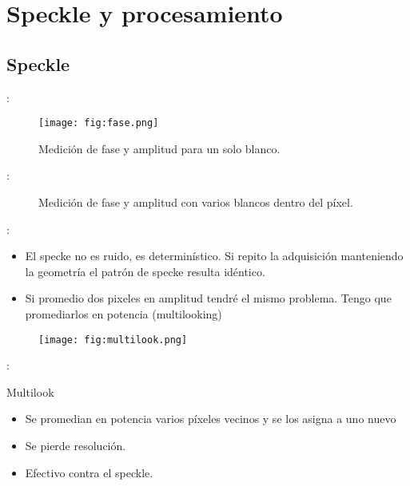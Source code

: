 \section{Speckle y procesamiento}

\subsection{Speckle}

\begin{frame}{\secname : \subsecname}
  \begin{figure}
    \centering
    \texttt{[image: fig:fase.png]}
    \caption{Medición de fase y amplitud para un solo blanco.}
    \label{}
  \end{figure}
\end{frame}

\begin{frame}{\secname : \subsecname}
  \begin{figure}
    \centering
    \caption{Medición de fase y amplitud con varios blancos dentro del píxel.}
    \label{}
  \end{figure}
\end{frame}


\begin{frame}{\secname : \subsecname}
  \begin{itemize}
    \item El specke no es ruido, es determinístico. Si repito la adquisición manteniendo la geometría el patrón de specke resulta idéntico.
    \item Si promedio dos pixeles en amplitud tendré el mismo problema. Tengo que promediarlos en potencia (multilooking)
  \end{itemize}
      \begin{figure}
        \centering
        \texttt{[image: fig:multilook.png]}
        \label{}
      \end{figure}

\end{frame}


\begin{frame}{\secname : \subsecname}

   \begin{block}{Multilook}
     \begin{itemize}
       \item Se promedian en potencia varios píxeles vecinos y se los asigna a uno nuevo
       \item Se pierde resolución.
       \item Efectivo contra el speckle.
     \end{itemize}
   \end{block}

\end{frame}


